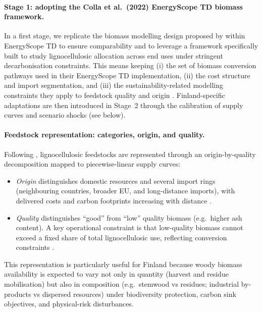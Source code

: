 \documentclass{article}
\begin{document}
\paragraph{Stage 1: adopting the Colla et al.\ (2022) EnergyScope TD biomass framework.}
In a first stage, we replicate the biomass modelling design proposed by \citet{colla_optimal_2022} within EnergyScope TD to ensure comparability and to leverage a framework specifically built to study lignocellulosic allocation across end uses under stringent decarbonisation constraints. This means keeping (i) the set of biomass conversion pathways used in their EnergyScope TD implementation, (ii) the cost structure and import segmentation, and (iii) the sustainability-related modelling constraints they apply to feedstock quality and origin \citep{colla_optimal_2022}. Finland-specific adaptations are then introduced in Stage~2 through the calibration of supply curves and scenario shocks (see below).

\paragraph{Feedstock representation: categories, origin, and quality.}
Following \citet{colla_optimal_2022}, lignocellulosic feedstocks are represented through an origin-by-quality decomposition mapped to piecewise-linear supply curves:
\begin{itemize}
    \item \textit{Origin} distinguishes domestic resources and several import rings (neighbouring countries, broader EU, and long-distance imports), with delivered costs and carbon footprints increasing with distance \citep{colla_optimal_2022}.
    \item \textit{Quality} distinguishes ``good'' from ``low'' quality biomass (e.g.\ higher ash content). A key operational constraint is that low-quality biomass cannot exceed a fixed share of total lignocellulosic use, reflecting conversion constraints \citep{colla_optimal_2022}.
\end{itemize}
This representation is particularly useful for Finland because woody biomass availability is expected to vary not only in quantity (harvest and residue mobilisation) but also in composition (e.g.\ stemwood vs residues; industrial by-products vs dispersed resources) under biodiversity protection, carbon sink objectives, and physical-risk disturbances.
\end{document}
